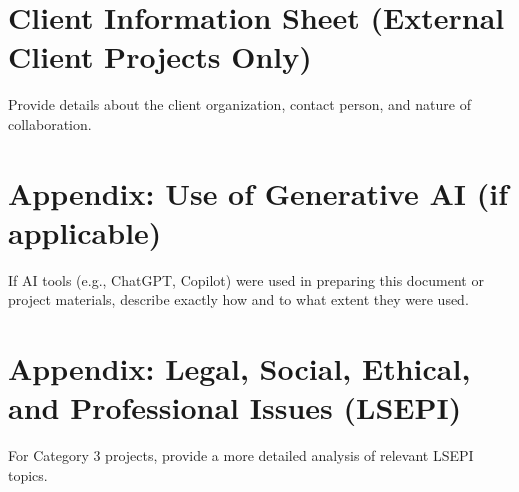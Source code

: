 \documentclass[12pt,a4paper]{article}
\begin{document}
\newpage
\section{Client Information Sheet (External Client Projects Only)}
Provide details about the client organization, contact person, and nature of collaboration.

\newpage
\section{Appendix: Use of Generative AI (if applicable)}
If AI tools (e.g., ChatGPT, Copilot) were used in preparing this document or project materials, describe exactly how and to what extent they were used.

\newpage
\section{Appendix: Legal, Social, Ethical, and Professional Issues (LSEPI)}
For Category 3 projects, provide a more detailed analysis of relevant LSEPI topics.
\end{document}

